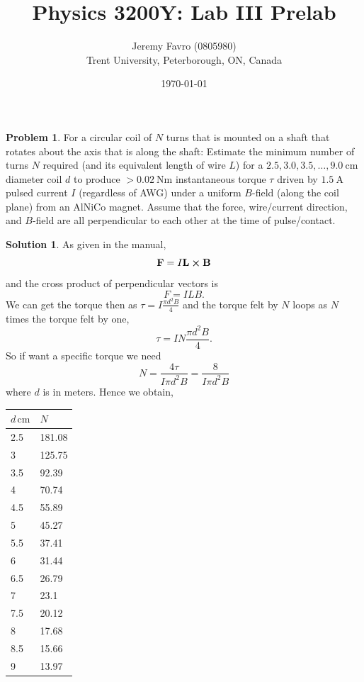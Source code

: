\documentclass[10pt]{article}
\title{Physics 3200Y: Lab III Prelab}
\author{Jeremy Favro (0805980) \\ Trent University, Peterborough, ON, Canada}
\date{\today}
\theoremstyle{definition}
\newtheorem{problem}{Problem}
\newtheorem{soln}{Solution}
\newcommand{\bv}[1]{\bm{\mathrm{#1}}}
\begin{document}
\maketitle

\begin{problem}
For a circular coil of $N$ turns that is mounted on a shaft that rotates about the axis that is along
the shaft: Estimate the minimum number of turns $N$ required (and its equivalent length of wire $L$) for a $2.5,
  3.0,3.5,\dots,\qty{9.0}{\centi\meter}$ diameter coil $d$ to produce $> \qty{0.02}{\newton\meter}$ instantaneous torque $\tau$ driven by $\qty{1.5}{\ampere}$ pulsed current
$I$ (regardless of AWG) under a uniform $B$-field (along the coil plane) from an AlNiCo magnet. Assume that the
force, wire/current direction, and $B$-field are all perpendicular to each other at the time of pulse/contact.
\end{problem}
\begin{soln}
  As given in the manual,
  $$\bv{F}=I\bv{L}\cross\bv{B}$$
  and the cross product of perpendicular vectors is
  $$F=ILB.$$
  We can get the torque then as
  $\tau=I\frac{\pi d^2B}{4}$ and the torque felt by $N$ loops as $N$ times the torque felt by one,
  $$\tau=IN\frac{\pi d^2B}{4}.$$
  So if want a specific torque we need
  $$N=\frac{4\tau}{I\pi d^2B}=\frac{8}{I\pi d^2 B}$$
  where $d$ is in meters.
  Hence we obtain,

  \begin{table}[ht!]
    \centering%
    \begin{tabular}{ll}
      \toprule
      $d\,\unit{\centi\meter}$ & $N$    \\
      \midrule
      2.5                      & 181.08 \\
      3                        & 125.75 \\
      3.5                      & 92.39  \\
      4                        & 70.74  \\
      4.5                      & 55.89  \\
      5                        & 45.27  \\
      5.5                      & 37.41  \\
      6                        & 31.44  \\
      6.5                      & 26.79  \\
      7                        & 23.1   \\
      7.5                      & 20.12  \\
      8                        & 17.68  \\
      8.5                      & 15.66  \\
      9                        & 13.97  \\
      \bottomrule
    \end{tabular}
  \end{table}
\end{soln}
\end{document}
